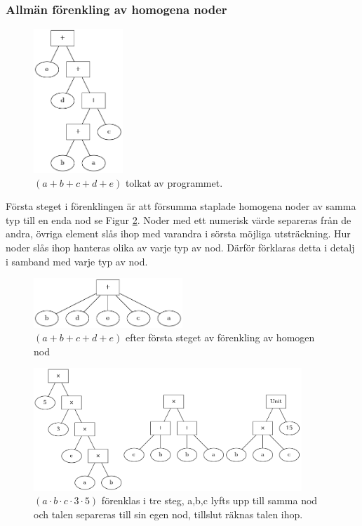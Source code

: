 \documentclass[12pt,a4paper]{article}
\begin{document}
\subsubsection{Allmän förenkling av homogena noder}
\label{subsubsec:förenkling_homogena}
\begin{figure}[h!]
  \centering
  \includegraphics[width=0.3\textwidth]{image22}
  \caption{\((a + b + c + d + e)\) tolkat av programmet.}
  \label{fig:2311}
\end{figure}
Första steget i förenklingen är att försumma staplade homogena noder av samma typ till en enda nod se Figur \ref{fig:2312}. Noder med ett numerisk värde separeras från de andra, övriga element slås ihop med varandra i sörsta möjliga utsträckning. Hur noder slås ihop hanteras olika av varje typ av nod. Därför förklaras detta i detalj i samband med varje typ av nod.\par
\begin{figure}[h!]
  \centering
  \includegraphics[width=0.5\textwidth]{image16}
  \caption{\((a + b + c + d + e)\) efter första steget av förenkling av homogen nod}
  \label{fig:2312}
\end{figure}
\begin{figure}[h!]
  \centering
  \includegraphics[width=0.9\textwidth]{image-merged}
  \caption{\((a \cdot b \cdot c \cdot 3 \cdot 5)\) förenklas i tre steg, a,b,c lyfts upp till samma nod och talen separeras till sin egen nod, tillslut räknas talen ihop.}
  \label{fig:2313}
\end{figure}
\end{document}
